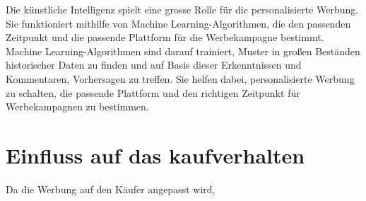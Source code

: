 \documentclass{article}
\begin{document}
 Die künstliche Intelligenz spielt eine grosse Rolle für die personalisierte Werbung. Sie funktioniert mithilfe von Machine Learning-Algorithmen, die den passenden Zeitpunkt und die passende Plattform für die Werbekampagne bestimmt. Machine Learning-Algorithmen sind darauf trainiert, Muster in großen Beständen historischer Daten zu finden und auf Basis dieser Erkenntnissen und Kommentaren, Vorhersagen zu treffen. Sie helfen dabei, personalisierte Werbung zu schalten, die passende Plattform und den richtigen Zeitpunkt für Werbekampagnen zu bestimmen. 

 \section{Einfluss auf das kaufverhalten}
 Da die Werbung auf den Käufer angepasst wird, 


\printbibliography
\end{document}
